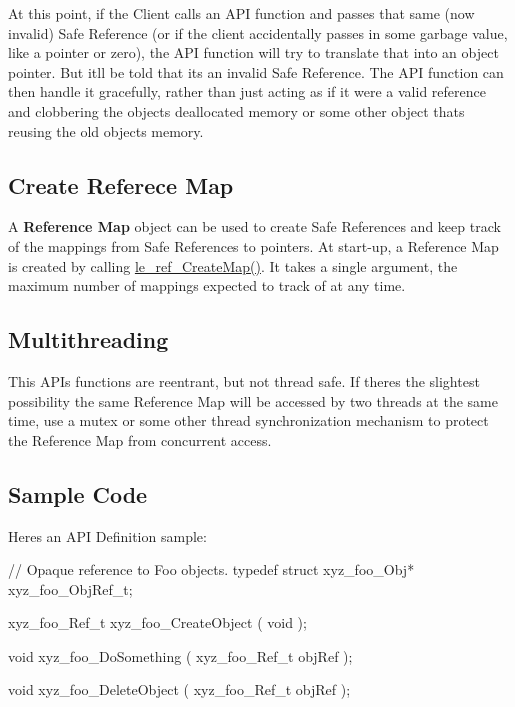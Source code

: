 At this point, if the Client calls an A\+P\+I function and passes that same (now invalid) Safe Reference (or if the client accidentally passes in some garbage value, like a pointer or zero), the A\+P\+I function will try to translate that into an object pointer. But it\textquotesingle{}ll be told that it\textquotesingle{}s an invalid Safe Reference. The A\+P\+I function can then handle it gracefully, rather than just acting as if it were a valid reference and clobbering the object\textquotesingle{}s deallocated memory or some other object that\textquotesingle{}s reusing the old object\textquotesingle{}s memory.\hypertarget{c_safe_ref_c_safeRef_map}{}\subsection{Create Referece Map}\label{c_safe_ref_c_safeRef_map}
A {\bfseries  Reference Map } object can be used to create Safe References and keep track of the mappings from Safe References to pointers. At start-\/up, a Reference Map is created by calling {\ttfamily \hyperlink{le__safe_ref_8h_a85faf3c75723a1af0e1adf720d9c9dca}{le\+\_\+ref\+\_\+\+Create\+Map()}}. It takes a single argument, the maximum number of mappings expected to track of at any time.\hypertarget{c_safe_ref_c_safeRef_multithreading}{}\subsection{Multithreading}\label{c_safe_ref_c_safeRef_multithreading}
This A\+P\+I\textquotesingle{}s functions are reentrant, but not thread safe. If there\textquotesingle{}s the slightest possibility the same Reference Map will be accessed by two threads at the same time, use a mutex or some other thread synchronization mechanism to protect the Reference Map from concurrent access.\hypertarget{c_safe_ref_c_safeRef_example}{}\subsection{Sample Code}\label{c_safe_ref_c_safeRef_example}
Here\textquotesingle{}s an A\+P\+I Definition sample\+:


\begin{DoxyCode}
\textcolor{comment}{// Opaque reference to Foo objects.}
\textcolor{keyword}{typedef} \textcolor{keyword}{struct }xyz\_foo\_Obj* xyz\_foo\_ObjRef\_t;

xyz\_foo\_Ref\_t xyz\_foo\_CreateObject
(
    \textcolor{keywordtype}{void}
);

\textcolor{keywordtype}{void} xyz\_foo\_DoSomething
(
    xyz\_foo\_Ref\_t objRef
);

\textcolor{keywordtype}{void} xyz\_foo\_DeleteObject
(
    xyz\_foo\_Ref\_t objRef
);
\end{DoxyCode}


